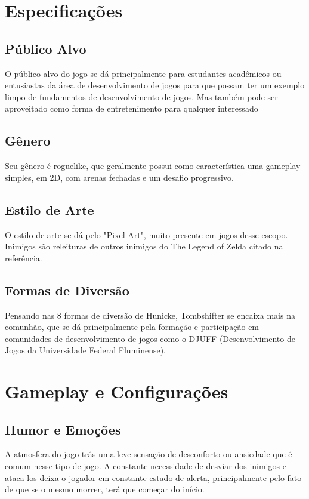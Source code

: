 \documentclass[a4paper]{scrreprt}
\begin{document}

\chapter{Especificações}

    \section{Público Alvo}
        O público alvo do jogo se dá principalmente para estudantes acadêmicos ou entusiastas da área de desenvolvimento de jogos para que possam ter um exemplo limpo de fundamentos de desenvolvimento de jogos. Mas também pode ser aproveitado como forma de entretenimento para qualquer interessado 

    \section{Gênero}
        Seu gênero é roguelike, que geralmente possui como característica uma gameplay simples, em 2D, com arenas fechadas e um desafio progressivo.

    \section{Estilo de Arte}
        O estilo de arte se dá pelo "Pixel-Art", muito presente em jogos desse escopo. Inimigos são releituras de outros inimigos do The Legend of Zelda citado na referência.


    \section{Formas de Diversão}
        Pensando nas 8 formas de diversão de Hunicke, Tombshifter se encaixa mais na comunhão, que se dá principalmente pela formação e participação em comunidades de desenvolvimento de jogos como o DJUFF (Desenvolvimento de Jogos da Universidade Federal Fluminense).



\chapter{Gameplay e Configurações} 

    \section{Humor e Emoções}
        A atmosfera do jogo trás uma leve sensação de desconforto ou ansiedade que é comum nesse tipo de jogo. A constante necessidade de desviar dos inimigos e ataca-los deixa o jogador em constante estado de alerta, principalmente pelo fato de que se o mesmo morrer, terá que começar do início.
\end{document}
